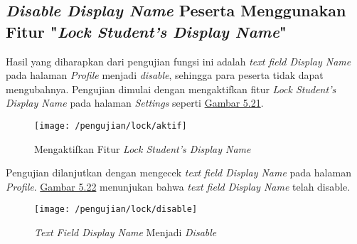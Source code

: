 	\subsection{\textit{Disable Display Name} Peserta Menggunakan Fitur "\textit{Lock Student's Display Name}"}
	Hasil yang diharapkan dari pengujian fungsi ini adalah \textit{text field Display Name} pada halaman \textit{Profile} menjadi \textit{disable}, sehingga para peserta tidak dapat mengubahnya. Pengujian dimulai dengan mengaktifkan fitur \textit{Lock Student's Display Name} pada halaman \textit{Settings} seperti \hyperref[fig:dp]{Gambar 5.21}.
	\begin{figure}[H]
		\centering  
		\texttt{[image: /pengujian/lock/aktif]}  
		\caption[Mengaktifkan Fitur \textit{Lock Student's Display Name}]{Mengaktifkan Fitur \textit{Lock Student's Display Name}} 
		\label{fig:aktif} 
	\end{figure}
	
	Pengujian dilanjutkan dengan mengecek \textit{text field Display Name} pada halaman \textit{Profile}. \hyperref[fig:dp]{Gambar 5.22} menunjukan bahwa \textit{text field Display Name} telah disable.
	\begin{figure}[H]
		\centering  
		\texttt{[image: /pengujian/lock/disable]}  
		\caption[\textit{Text Field Display Name} Menjadi \textit{Disable}]{\textit{Text Field Display Name} Menjadi \textit{Disable}} 
		\label{fig:disable} 
	\end{figure}